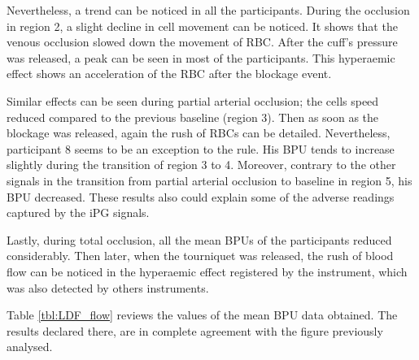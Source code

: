 Nevertheless, a trend can be noticed in all the participants. During the occlusion in region 2, a slight decline in cell movement can be noticed. It shows that the venous occlusion slowed down the movement of RBC. After the cuff's pressure was released, a peak can be seen in most of the participants. This hyperaemic effect shows an acceleration of the RBC after the blockage event. 

Similar effects can be seen during partial arterial occlusion; the cells speed reduced compared to the previous baseline (region 3). Then as soon as the blockage was released, again the rush of RBCs can be detailed. Nevertheless, participant 8 seems to be an exception to the rule. His BPU tends to increase slightly during the transition of region 3 to 4. Moreover, contrary to the other signals in the transition from partial arterial occlusion to baseline in region 5, his BPU decreased. These results also could explain some of the adverse readings captured by the iPG signals.

Lastly, during total occlusion, all the mean BPUs of the participants reduced considerably. Then later, when the tourniquet was released, the rush of blood flow can be noticed in the hyperaemic effect registered by the instrument, which was also detected by others instruments.

Table \ref{tbl:LDF_flow} reviews the values of the mean BPU data obtained. The results declared there, are in complete agreement with the figure previously analysed.

